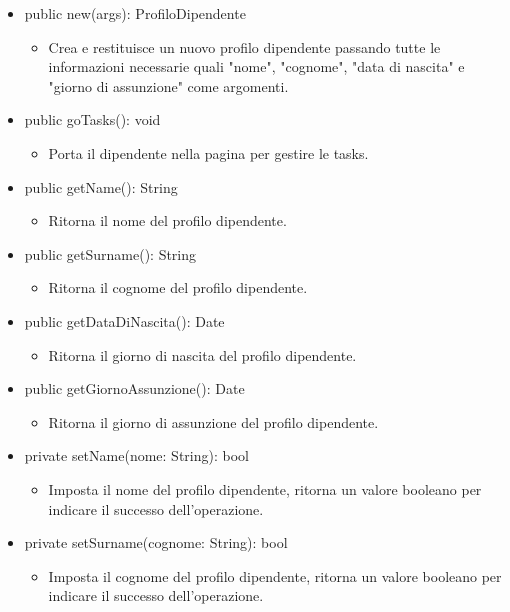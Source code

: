 \documentclass{report}
\begin{document}
\begin{itemize}
\item public new(args): ProfiloDipendente
\begin{itemize}
    \item Crea e restituisce un nuovo profilo dipendente passando tutte le informazioni necessarie quali "nome", "cognome", "data di nascita" e "giorno di assunzione" come argomenti.
\end{itemize}
\item public goTasks(): void
\begin{itemize}
    \item Porta il dipendente nella pagina per gestire le tasks.
\end{itemize}
\item public getName(): String
\begin{itemize}
    \item Ritorna il nome del profilo dipendente.
\end{itemize}
\item public getSurname(): String
\begin{itemize}
    \item Ritorna il cognome del profilo dipendente.
\end{itemize}
\item public getDataDiNascita(): Date
\begin{itemize}
    \item Ritorna il giorno di nascita del profilo dipendente.
\end{itemize}
\item public getGiornoAssunzione(): Date
\begin{itemize}
    \item Ritorna il giorno di assunzione del profilo dipendente.
\end{itemize}
\item private setName(nome: String): bool
\begin{itemize}
    \item Imposta il nome del profilo dipendente, ritorna un valore booleano per indicare il successo dell'operazione.
\end{itemize}
\item private setSurname(cognome: String): bool
\begin{itemize}
    \item Imposta il cognome del profilo dipendente, ritorna un valore booleano per indicare il successo dell'operazione.
\end{itemize}

\end{itemize}
\end{document}
